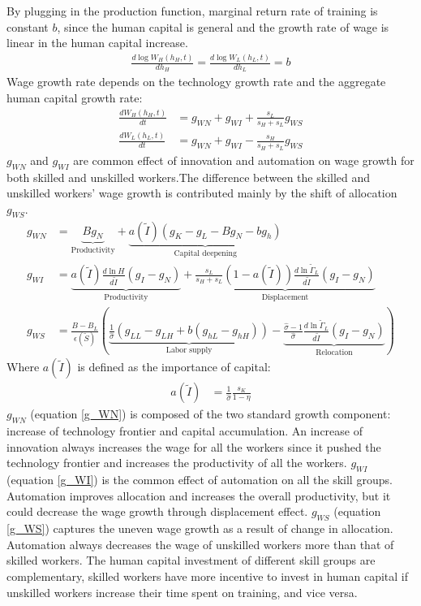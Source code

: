 \documentclass[12pt]{article}
\begin{document}
By plugging in the production function, marginal return rate of training is constant $b$, since the human capital is general and the growth rate of wage is linear in the human capital increase. 
\begin{align*}
\frac{d\log W_H(h_H,t)}{dh_H} = \frac{d\log W_L(h_L,t)}{dh_L} = b
\end{align*}
Wage growth rate depends on the technology growth rate and the aggregate human capital growth rate: 
\begin{align}
\label{gW_H}
\frac{dW_H(h_H,t)}{dt} &= g_{WN}+g_{WI}+\frac{s_L}{s_H+s_L}g_{WS}\\
\label{gW_L}
\frac{dW_L(h_L,t)}{dt}  &= g_{WN}+g_{WI}-\frac{s_H}{s_H+s_L}g_{WS}
\end{align}
$g_{WN}$ and $g_{WI}$ are common effect of innovation and automation on wage growth for both skilled and unskilled workers.The difference between the skilled and unskilled workers' wage growth is contributed mainly by the shift of allocation $g_{WS}$. 
\begin{align}
\label{g_WN}
g_{WN} &= \underbrace{Bg_N}_{\text{Productivity}}+\underbrace{a(\tilde{I})(g_K-g_L-Bg_N-bg_h)}_{\text{Capital deepening}} \\
\label{g_WI}
g_{WI} &= \underbrace{a(\tilde{I})\frac{d\ln H}{d\tilde{I}}(g_I-g_N)}_{\text{Productivity}}+\underbrace{\frac{s_L}{s_H+s_L}(1-a(\tilde{I}))\frac{d\ln \tilde{\Gamma}_L}{d\tilde{I}}(g_I-g_N)}_{\text{Displacement}} \\
\label{g_WS}
g_{WS}&= \frac{B-B_L}{\epsilon(\tilde{S})}(\underbrace{\frac{1}{\hat{\sigma}}(g_{LL}-g_{LH}+b(g_{hL}-g_{hH}))}_{\text{Labor supply}}-\underbrace{\frac{\hat{\sigma}-1}{\hat{\sigma}}\frac{d\ln \tilde{\Gamma}_L}{d\tilde{I}}(g_I-g_N)}_{\text{Relocation}}) 
\end{align}
Where $a(\tilde{I})$ is defined as the importance of capital:
\begin{align*}
a(\tilde{I}) &= \frac{1}{\hat{\sigma}}\frac{s_K}{1-\eta} 
\end{align*}
$g_{WN}$ (equation \ref{g_WN}) is composed of the two standard growth component: increase of technology frontier and capital accumulation. An increase of innovation always increases the wage for all the workers since it pushed the technology frontier and increases the productivity of all the workers. $g_{WI}$ (equation \ref{g_WI}) is the common effect of automation on all the skill groups. Automation improves allocation and increases the overall productivity, but it could decrease the wage growth through displacement effect. $g_{WS}$ (equation \ref{g_WS}) captures the uneven wage growth as a result of change in allocation. Automation always decreases the wage of unskilled workers more than that of skilled workers. The human capital investment of different skill groups are complementary, skilled workers have more incentive to invest in human capital if unskilled workers increase their time spent on training, and vice versa. 
\end{document}
